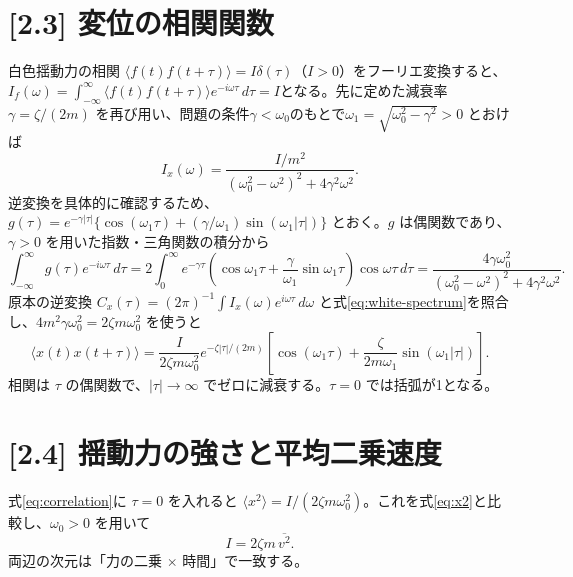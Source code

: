 \documentclass[10pt,a4paper]{article}
\begin{document}
\section*{[2.3] 変位の相関関数}
白色揺動力の相関 $\langle f(t)f(t+\tau)\rangle=I\delta(\tau)$（$I>0$）をフーリエ変換すると、$I_f(\omega)=\int_{-\infty}^{\infty}\langle f(t)f(t+\tau)\rangle e^{-i\omega\tau}\,d\tau=I$となる。先に定めた減衰率 $\gamma=\zeta/(2m)$ を再び用い、問題の条件$\gamma<\omega_0$のもとで$\omega_1=\sqrt{\omega_0^2-\gamma^2}>0$ とおけば
\begin{equation}
 I_x(\omega)=\frac{I/m^2}{(\omega_0^2-\omega^2)^2+4\gamma^2\omega^2}.
 \label{eq:white-spectrum}
\end{equation}
逆変換を具体的に確認するため、$g(\tau)=e^{-\gamma|\tau|}\{\cos(\omega_1\tau)+(\gamma/\omega_1)\sin(\omega_1|\tau|)\}$ とおく。$g$ は偶関数であり、$\gamma>0$ を用いた指数・三角関数の積分から
\[
\int_{-\infty}^{\infty}g(\tau)e^{-i\omega\tau}\,d\tau
=2\int_0^\infty e^{-\gamma\tau}
 \left(\cos\omega_1\tau+\frac{\gamma}{\omega_1}\sin\omega_1\tau\right)
 \cos\omega\tau\,d\tau
=\frac{4\gamma\omega_0^2}{(\omega_0^2-\omega^2)^2+4\gamma^2\omega^2}.
\]
原本の逆変換 $C_x(\tau)=(2\pi)^{-1}\int I_x(\omega)e^{i\omega\tau}\,d\omega$ と式\eqref{eq:white-spectrum}を照合し、$4m^2\gamma\omega_0^2=2\zeta m\omega_0^2$ を使うと
\begin{equation}
\boxed{\langle x(t)x(t+\tau)\rangle
=\frac{I}{2\zeta m\omega_0^2}e^{-\zeta|\tau|/(2m)}
\left[\cos(\omega_1\tau)+\frac{\zeta}{2m\omega_1}\sin(\omega_1|\tau|)\right]}.
\label{eq:correlation}
\end{equation}
相関は $\tau$ の偶関数で、$|\tau|\to\infty$ でゼロに減衰する。$\tau=0$ では括弧が1となる。

\section*{[2.4] 揺動力の強さと平均二乗速度}
式\eqref{eq:correlation}に $\tau=0$ を入れると $\langle x^2\rangle=I/(2\zeta m\omega_0^2)$。これを式\eqref{eq:x2}と比較し、$\omega_0>0$ を用いて
\begin{equation}
\boxed{I=2\zeta m\,\overline{v^2}}.
\end{equation}
両辺の次元は「力の二乗 $\times$ 時間」で一致する。
\end{document}
